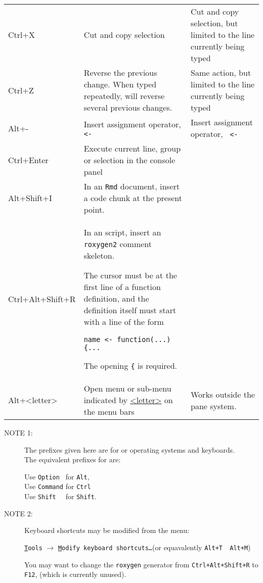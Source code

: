 \documentclass[11pt]{article}
\begin{document}
\begin{xltabular}{1.0\linewidth}[!htp]{@{}lXX@{}}
  Ctrl+X & Cut and copy selection & Cut and copy selection, but
  limited to the  line currently being typed\\
  Ctrl+Z & Reverse the previous change.  When typed repeatedly, will
  reverse several previous changes. & Same action, but limited to the
  line currently being typed\\
  Alt+- & Insert assignment operator, \texttt{ <- } & Insert
  assignment operator, \texttt{ <- }\\
  Ctrl+Enter & Execute current line, group or selection in the console
  panel & \\
  Alt+Shift+I & In an \texttt{Rmd} document, insert a code chunk at
  the present  point. & \\
  Ctrl+Alt+Shift+R & In an \R script, insert an \texttt{roxygen2}
  comment skeleton.\par
  The cursor must be at the first line of a function definition, and
  the definition itself must start with a line of the form\par
  \texttt{name <- function(...) \{...}\par
  The opening \texttt{\{} is required.&\\
  \midrule Alt+<letter> & Open menu or sub-menu indicated by
  \underline{<letter>} on the menu bars& Works outside
  the pane system.\\
  \bottomrule
\end{xltabular}

\begin{small}
\begin{description}
\item[NOTE 1:] The prefixes given here are for \Windows or \Linux
  operating systems and keyboards.\\
  The equivalent prefixes for \MacOS are:

  Use \verb|Option | for \verb|Alt|,\\
  Use \verb|Command| for \verb|Ctrl|\\
  Use \verb|Shift  | for \verb|Shift|.
\item[NOTE 2:] Keyboard shortcuts may be modified from the menu:
  \begin{center}
    \texttt{\underline{T}ools} $\longrightarrow$ \texttt{\underline{M}odify keyboard shortcuts\dots}\quad (or
    equavalently \verb|Alt+T  Alt+M|)
  \end{center}
  You may want to change the \texttt{roxygen} generator from
  \verb|Ctrl+Alt+Shift+R| to \verb|F12|, (which is currently unused). 
\end{description}
\end{small}
\end{document}
